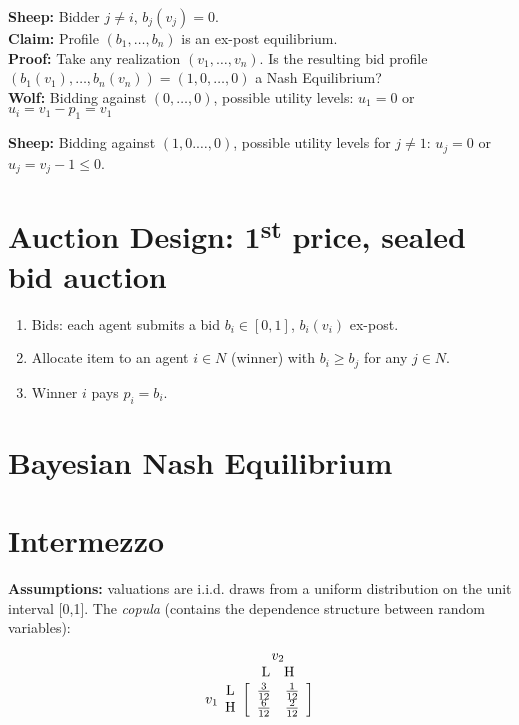 \documentclass{article}
\begin{document}
\noindent
\textbf{Sheep:} Bidder $j\neq i$, $b_j(v_j)=0$.\\

\noindent
\textbf{Claim:} Profile $(b_1,\dots,b_n)$ is an ex-post equilibrium.\\

\noindent
\textbf{Proof:} Take any realization $(v_1,\dots,v_n)$. Is the resulting bid profile $(b_1(v_1),\dots,b_n(v_n))=(1,0,\dots,0)$ a Nash Equilibrium?\\

\noindent
\textbf{Wolf:} Bidding against $(0,\dots,0)$, possible utility levels: $u_1=0$ or $u_i=v_1-p_1=v_1$

\noindent
\textbf{Sheep:} Bidding against $(1,0.\dots,0)$, possible utility levels for $j\neq 1$: $u_j=0$ or $u_j=v_j-1\leq0$.

\section*{Auction Design: 1\textsuperscript{st} price, sealed bid auction}

\begin{enumerate}
    \item Bids: each agent submits a bid $b_i\in[0,1]$, $b_i(v_i)$ ex-post.
    \item Allocate item to an agent $i\in N$ (winner) with $b_i\geq b_j$ for any $j\in N$.
    \item Winner $i$ pays $p_i=b_i$.
\end{enumerate}

\section*{Bayesian Nash Equilibrium}

\section*{Intermezzo}
\textbf{Assumptions:} valuations are i.i.d. draws from a uniform distribution on the unit interval [0,1]. 
\noindent
The \textit{copula} (contains the dependence structure between random variables):
\begin{equation*}
v_1
\begin{array}{c}
    \text{L} \\
    \text{H}
\end{array}
\\
\overset
{
    \begin{array}{cc}
    \multicolumn{2}{c}{v_2}\\
    \text{L}   &  \text{H}\\
    \end{array}
}
{
    \left[
        \begin{array}{cc}
        \frac{3}{12} & \frac{1}{12} \\
        \frac{6}{12} & \frac{2}{12} \\
        \end{array}
    \right]
}
\end{equation*}
\end{document}
